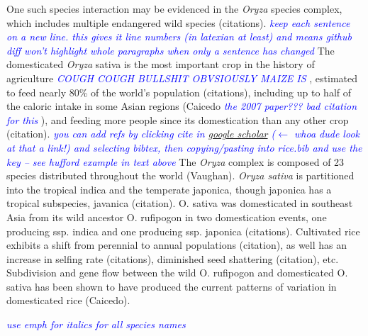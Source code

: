 \documentclass[11pt]{article} %
\newcommand{\jri}[1]{\textcolor{blue}{ \emph{\scriptsize  #1}} } %
\begin{document}
\begin{linenumbers}
One such species interaction may be evidenced in the \emph{Oryza} species complex, which includes multiple endangered wild species (citations).  
\jri{keep each sentence on a new line. this gives it line numbers (in latexian at least) and means github diff won't highlight whole paragraphs when only a sentence has changed}
The domesticated \emph{Oryza} sativa is the most important crop in the history of agriculture \jri{COUGH COUGH BULLSHIT OBVSIOUSLY MAIZE IS}, estimated to feed nearly 80\% of the world’s population (citations), including up to half of the caloric intake in some Asian regions (Caicedo \jri{the 2007 paper??? bad citation for this}), and feeding more people since its domestication than any other crop (citation).  \jri{you can add refs by clicking cite in \href{http://scholar.google.com/scholar?hl=en&q=caicedo+2007+rice&btnG=&as_sdt=1\%2C5&as_sdtp=#}{google scholar} ($\leftarrow$ whoa dude look at that a link!)  and selecting bibtex, then copying/pasting into rice.bib and use the key -- see hufford example in text above} The \emph{Oryza} complex is composed of 23 species distributed throughout the world (Vaughan). 
 \emph{Oryza sativa} is partitioned into the tropical indica and the temperate japonica, though japonica has a tropical subspecies, javanica (citation).  
O. sativa was domesticated in southeast Asia from its wild ancestor O. rufipogon in two domestication events, one producing ssp. indica and one producing ssp. japonica (citations).  Cultivated rice exhibits a shift from perennial to annual populations (citation), as well has an increase in selfing rate (citations), diminished seed shattering (citation), etc. 
Subdivision and gene flow between the wild O. rufipogon and domesticated O. sativa has been shown to have produced the current patterns of variation in domesticated rice (Caicedo). 

\jri{use emph for italics for all species names}


\end{linenumbers}
\end{document}
